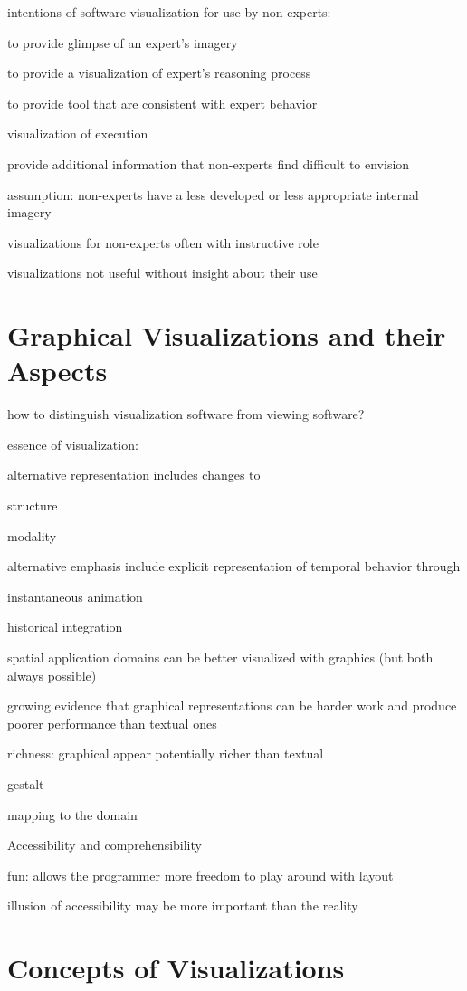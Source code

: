 \documentclass[11pt, a4paper, ngerman, twoside]{article}
\theoremstyle{plain}\newtheorem{Lemma}{Lemma}
\theoremstyle{plain}\newtheorem{Satz}[Lemma]{Satz}
\theoremstyle{definition}\newtheorem{Definition}[Lemma]{Definition}
\theoremstyle{definition}\newtheorem*{Beispiel}{Beispiel}
\theoremstyle{remark}\newtheorem*{Bemerkung}{Bemerkung}
\begin{document}
intentions of software visualization for use by non-experts:

to provide glimpse of an expert’s imagery

to provide a visualization of expert’s reasoning process

to provide tool that are consistent with expert behavior

visualization of execution

provide additional information that non-experts find difficult to envision

assumption: non-experts have a less developed or less appropriate internal imagery

visualizations for non-experts often with instructive role

visualizations not useful without insight about their use

\section{Graphical Visualizations and their Aspects}

how to distinguish visualization software from viewing software?

essence of visualization:

alternative representation includes changes to

structure

modality

alternative emphasis include explicit representation of temporal behavior through

instantaneous animation

historical integration

spatial application domains can be better visualized with graphics (but both always possible)

growing evidence that graphical representations can be harder work and produce poorer performance than textual ones 

richness: graphical appear potentially richer than textual

gestalt

mapping to the domain

Accessibility and comprehensibility

fun: allows the programmer more freedom to play around with layout

illusion of accessibility may be more important than the reality

\section{Concepts of Visualizations}
\end{document}
